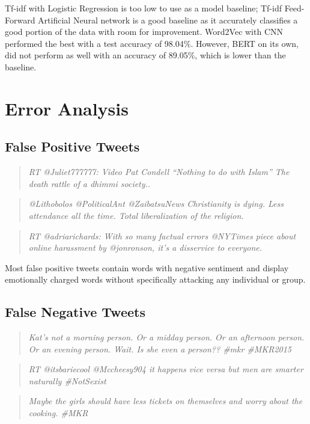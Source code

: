\documentclass[conference]{IEEEtran}
\begin{document}
Tf-idf with Logistic Regression is too low to use as a model baseline; Tf-idf Feed-Forward Artificial Neural network is a good baseline as it accurately classifies a good portion of the data with room for improvement. Word2Vec with CNN performed the best with a test accuracy of 98.04\%. However, BERT on its own, did not perform as well with an accuracy of 89.05\%, which is lower than the baseline. 


\section{Error Analysis}

\subsection{False Positive Tweets}
\begin{quotation}
\emph{RT @Juliet777777: Video Pat Condell “Nothing to do with Islam” The death rattle of a dhimmi society..}
\end{quotation}
\begin{quotation}
\emph{@Lithobolos @PoliticalAnt @ZaibatsuNews Christianity is dying.  Less attendance all the time. Total liberalization of the religion.}
\end{quotation}
\begin{quotation}
\emph{RT @adriarichards: With so many factual errors @NYTimes piece about online harassment by @jonronson, it's a disservice to everyone.}
\end{quotation}

Most false positive tweets contain words with negative sentiment and display emotionally charged words without specifically attacking any individual or group.

\subsection{False Negative Tweets}
\begin{quotation}
\emph{Kat's not a morning person. Or a midday person. Or an afternoon person. Or an evening person. Wait. Is she even a person??  \#mkr \#MKR2015}
\end{quotation}
\begin{quotation}
\emph{RT @itsbariecool @Mccheesy904 it happens vice versa but men are smarter naturally \#NotSexist}
\end{quotation}
\begin{quotation}
\emph{Maybe the girls should have less tickets on themselves and worry about the cooking. \#MKR}
\end{quotation}
\end{document}

